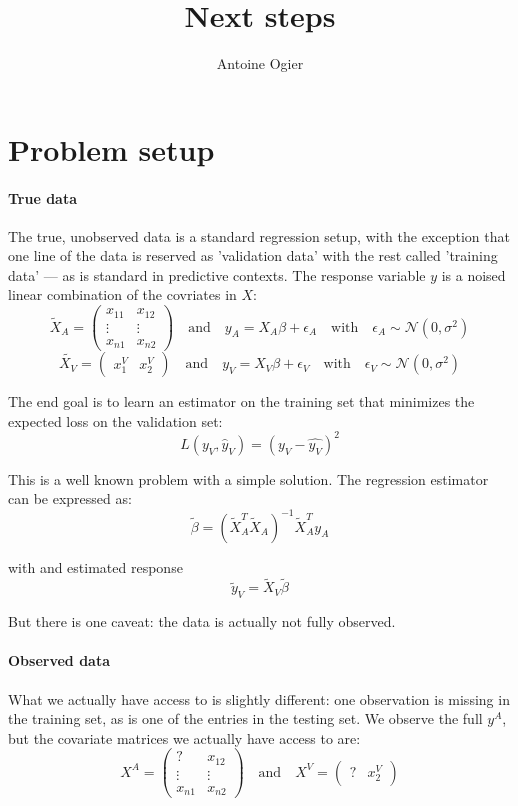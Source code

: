 \documentclass[12pt, a4paper]{article}
\title{Next steps}
\author{Antoine Ogier}
\begin{document}
\section{Problem setup}
\paragraph{True data}
The true, unobserved data is a standard regression setup, with the exception that one line of the data is reserved as 'validation data' with the rest called 'training data' --- as is standard in predictive contexts. The response variable $y$ is a noised linear combination of the covriates in $X$:
\begin{equation*}
\tilde{X}_A = 
\begin{pmatrix}
x_{11} & x_{12} \\
\vdots & \vdots \\
x_{n1} & x_{n2}
\end{pmatrix}
\quad \mathrm{and} \quad
y_A = X_A \beta + \epsilon_A
\quad \mathrm{with} \quad
\epsilon_A \sim \mathcal{N}(0, \sigma^2)
\end{equation*}
\begin{equation*}
\tilde{X_V} = 
\begin{pmatrix}
x_{1}^V & x_{2}^V
\end{pmatrix}
\quad \mathrm{and} \quad
y_V = X_V \beta + \epsilon_V
\quad \mathrm{with} \quad
\epsilon_V \sim \mathcal{N}(0, \sigma^2)
\end{equation*}

The end goal is to learn an estimator on the training set that minimizes the expected loss on the validation set:
$$
L(y_V, \hat{y}_V) = (y_V - \hat{y_V})^2
$$

This is a well known problem with a simple solution. The regression estimator can be expressed as:
$$ \tilde{\beta} = (\tilde{X}_A^T \tilde{X}_A)^{-1} \tilde{X}_A^T y_A $$

with and estimated response
$$ \tilde{y}_V = \tilde{X}_V \tilde{\beta} $$

But there is one caveat: the data is actually not fully observed.

\paragraph{Observed data}
What we actually have access to is slightly different: one observation is missing in the training set, as is one of the entries in the testing set. We observe the full $y^A$, but the covariate matrices we actually have access to are:
\begin{equation*}
X^A = 
\begin{pmatrix}
? & x_{12} \\
\vdots & \vdots \\
x_{n1} & x_{n2}
\end{pmatrix}
\quad \mathrm{and} \quad
X^V = 
\begin{pmatrix}
? & x_{2}^V
\end{pmatrix}
\end{equation*}
\end{document}
